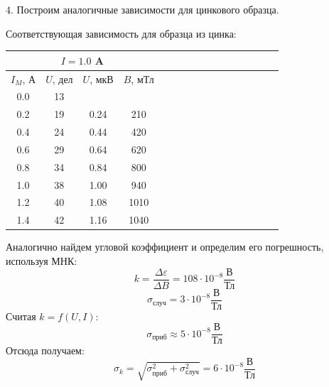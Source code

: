 \documentclass[14pt]{article}
\begin{document}
\vspace{1cm}
4. Построим аналогичные зависимости для цинкового образца.

Соответствующая зависимость для образца из цинка:

\begin{center}
\begin{tabular}{|c|c|c|c|c|c|c|c|c|c|c|c|c|c|c|c|}
\hline
\multicolumn{4}{|c|}{$I = 1.0$ A}							\\
\hline
$I_M$, А	&	$U$, дел	&	$U$, мкВ	&	$B$, мТл	\\
\hline
0.0			&	13			&				&				\\
\hline
0.2			&	19			&	0.24		&	210			\\
\hline
0.4			&	24			&	0.44		&	420			\\
\hline
0.6			&	29			&	0.64		&	620			\\
\hline
0.8			&	34			&	0.84		&	800 		\\
\hline
1.0			&	38			&	1.00		&	940 		\\
\hline
1.2			&	40			&	1.08		&	1010		\\
\hline
1.4			&	42			&	1.16		&	1040		\\
\hline
\end{tabular}
\end{center}

\vspace{1cm}
\begin{flushleft}
\end{flushleft}


Аналогично найдем угловой коэффициент и определим его погрешность, используя МНК:
$$
	k = \frac{\Delta\varepsilon}{\Delta B} = 108 \cdot 10^{-8} \frac{\text{В}}{\text{Тл}}
$$
$$
	\sigma_{\text{случ}} = 3 \cdot 10^{-8} \frac{\text{В}}{\text{Тл}}
$$
\noindent Считая $k = f(U, I)$:
$$
	\sigma_{\text{приб}} \approx 5 \cdot 10^{-8} \frac{\text{В}}{\text{Тл}}
$$
\noindent Отсюда получаем:
$$
	\sigma_{k} = \sqrt{\sigma_{\text{приб}}^2 + \sigma_{\text{случ}}^2} = 6 \cdot 10^{-8} \frac{\text{В}}{\text{Тл}}
$$
\end{document}

